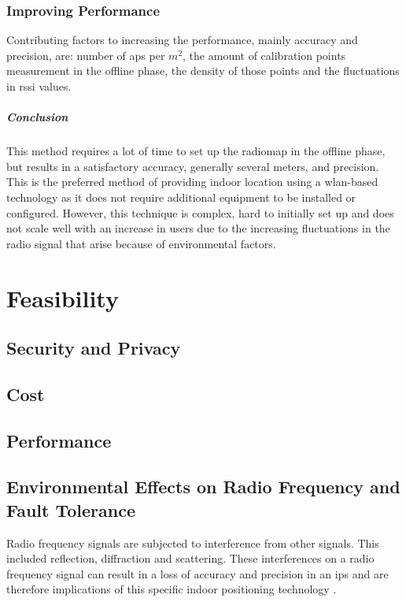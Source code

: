 \subsubsection{Improving Performance}
Contributing factors to increasing the performance, mainly accuracy and precision, are: number of \acrshort{ap}s per $m^2$, the amount of calibration points measurement in the offline phase, the density of those points and the fluctuations in  \acrshort{rssi} values.
\subparagraph{Conclusion}
This method requires a lot of time to set up the radiomap in the offline phase, but results in a satisfactory accuracy, generally several meters, and precision. This is the preferred method of providing indoor location using a \acrshort{wlan}-based technology as it does not require additional equipment to be installed or configured. However, this technique is complex, hard to initially set up and does not scale well with an increase in users due to the increasing fluctuations in the radio signal that arise because of environmental factors.
\section{Feasibility}
\subsection{Security and Privacy}
\subsection{Cost}
\subsection{Performance}
\subsection{Environmental Effects on Radio Frequency and Fault Tolerance}
Radio frequency signals are subjected to interference from other signals. This included reflection, diffraction and scattering. These interferences on a radio frequency signal can result in a loss of accuracy and precision in an \acrlong{ips} and are therefore implications of this specific indoor positioning technology \cite{S2016}. 
